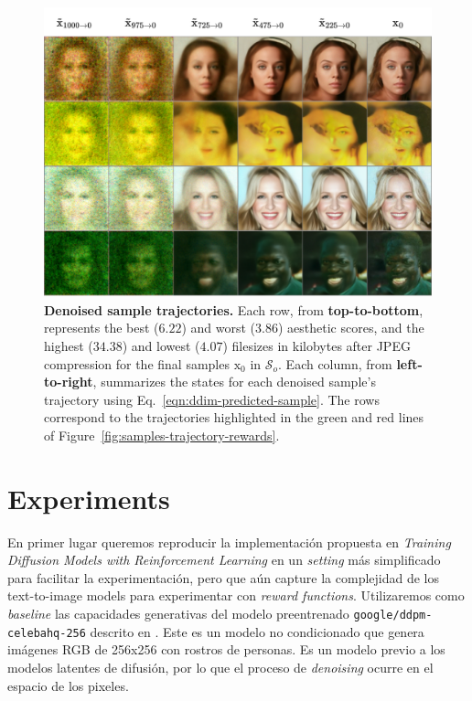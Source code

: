 \begin{figure}[ht]
  \centering
  \includegraphics[scale=0.85]{img/results/denoised-samples-trajectories.png}
  \vspace{-5pt}  %
    \captionsetup{width=\textwidth} %
    \caption{\textbf{Denoised sample trajectories.} Each row, from \textbf{top-to-bottom}, represents the best ($6.22$)
  and worst ($3.86$) aesthetic scores, and the highest ($34.38$) and lowest 
  ($4.07$) filesizes in kilobytes after JPEG compression for the final samples
  $\mathrm{x}_{0}$ in $\mathcal{S}_{o}$. Each column, from \textbf{left-to-right}, summarizes the states for each denoised sample's trajectory using Eq.~\ref{eqn:ddim-predicted-sample}. The rows correspond to the trajectories highlighted in the green and red lines of Figure~\ref{fig:samples-trajectory-rewards}.}
   \label{fig:sample-trajectories}
\end{figure}


\section{Experiments}

En primer lugar queremos reproducir la implementación propuesta en \textit{Training Diffusion Models with Reinforcement Learning} \cite{black2023training} en un \textit{setting} más simplificado para facilitar
la experimentación, pero que aún capture la complejidad de los text-to-image models para experimentar con \textit{reward functions}. Utilizaremos como \textit{baseline} las capacidades generativas del modelo preentrenado \texttt{google/ddpm-celebahq-256} descrito en \cite{ho2020denoising}. Este es un modelo no condicionado que genera imágenes RGB de 256x256 con rostros de personas. Es un modelo previo a los modelos latentes de difusión, por lo que el proceso de \textit{denoising} ocurre en el espacio de los pixeles. \\

